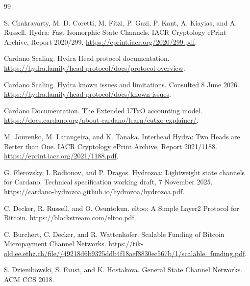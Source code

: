\documentclass[a4paper,11pt]{article}
\theoremstyle{definition}
\theoremstyle{plain}
\theoremstyle{remark}
\begin{document}
\begin{thebibliography}{99}
\raggedright

S. Chakravarty, M. D. Coretti, M. Fitzi, P. Gazi, P. Kant, A. Kiayias, and A.
Russell.
\newblock Hydra: Fast Isomorphic State Channels.
\newblock IACR Cryptology ePrint Archive, Report 2020/299.
\newblock \url{https://eprint.iacr.org/2020/299.pdf}.

Cardano Scaling.
\newblock Hydra Head protocol documentation.
\newblock \url{https://hydra.family/head-protocol/docs/protocol-overview}.

Cardano Scaling.
\newblock Hydra known issues and limitations.
\newblock Consulted 8 June 2026.
\newblock \url{https://hydra.family/head-protocol/docs/known-issues}.

Cardano Documentation.
\newblock The Extended UTxO accounting model.
\newblock \url{https://docs.cardano.org/about-cardano/learn/eutxo-explainer/}.

M. Jourenko, M. Larangeira, and K. Tanaka.
\newblock Interhead Hydra: Two Heads are Better than One.
\newblock IACR Cryptology ePrint Archive, Report 2021/1188.
\newblock \url{https://eprint.iacr.org/2021/1188.pdf}.

G. Flerovsky, I. Rodionov, and P. Dragos.
\newblock Hydrozoa: Lightweight state channels for Cardano.
\newblock Technical specification working draft, 7 November 2025.
\newblock \url{https://cardano-hydrozoa.github.io/hydrozoa/hydrozoa.pdf}.

C. Decker, R. Russell, and O. Osuntokun.
\newblock eltoo: A Simple Layer2 Protocol for Bitcoin.
\newblock \url{https://blockstream.com/eltoo.pdf}.

C. Burchert, C. Decker, and R. Wattenhofer.
\newblock Scalable Funding of Bitcoin Micropayment Channel Networks.
\newblock \url{https://tik-old.ee.ethz.ch/file//49218d6b9325ddb4f18aef8830ec567b/1/scalable_funding.pdf}.

S. Dziembowski, S. Faust, and K. Hostakova.
\newblock General State Channel Networks.
\newblock ACM CCS 2018.

\end{thebibliography}
\end{document}
